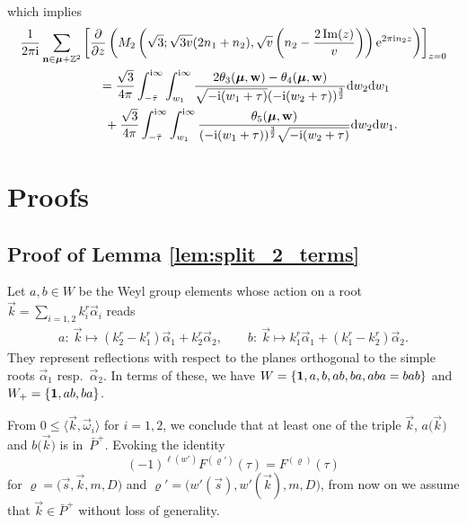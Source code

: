 \documentclass[pdftex]{sigma}
\def\BZ{\mathbb{Z}}
\def\bos{\varrho}
\def\al{\alpha}
\def\bmu{\boldsymbol{\mu}}
\theoremstyle{definition}
\numberwithin{equation}{section}
\begin{document}
which implies
\begin{gather*}%
	\frac{1}{2\pi {\rm i}}
	\sum_{\mathbf{n} \in \boldsymbol{\mu} + \BZ^2}
	\left[\frac{\partial}{\partial z}
	\left(M_2\left(\sqrt 3;\sqrt{3v}(2n_1+n_2),\sqrt{v}
	\left(n_2-\frac{2\operatorname{Im}(z)}{v}\right)\right)
	{\rm e}^{2\pi {\rm i}n_2z}\right)\right]_{z=0}\\
	\qquad=\frac{\sqrt{3}}{4 \pi}
	\int_{-\bar{\tau}}^{{\rm i} \infty}
	\int_{w_1}^{{\rm i} \infty}
	\frac{2\theta_3({\bmu}, {\bf w})-
		\theta_4({\bmu}, {\bf w})}{\sqrt{-{\rm i}(w_1+\tau)}(-{\rm i}(w_2+\tau)
		)^{\frac{3}{2}}}{\rm d}w_2{\rm d}w_1 \\
	\qquad\phantom{=}{}+\frac{\sqrt{3}}{4 \pi}\int_{-\bar{\tau}}^{{\rm i} \infty}\int_{w_1}^{{\rm i} \infty}\frac{\theta_5({\bmu}, {\bf w})}{(-{\rm i}(w_1+\tau))^{\frac{3}{2}}\sqrt{-{\rm i}(w_2+\tau)}}{\rm d}w_2{\rm d}w_1 .
\end{gather*}

\section{Proofs}
\subsection{Proof of Lemma \ref{lem:split_2_terms}}\label{pf_lem:split_2_terms}

Let $a, b\in W$ be the Weyl group elements whose action on a root $\vec k=\sum_{i=1,2} k_i^r \vec \alpha_i $ reads
\begin{gather}
	a\colon\ \vec{k} \mapsto (k_2^r-k_1^r)\vec{\al}_1 +k_2^r \vec{\al}_2,
	\qquad
	b\colon\ \vec{k} \mapsto k_1^r \vec{\al}_1 + (k_1^r-k_2^r) \vec{\al}_2 .
	\label{eq:abaction}
\end{gather}
They represent reflections with respect to the planes orthogonal to the simple roots $\vec\alpha_1$ resp.\ $\vec\alpha_2$.
In terms of these, we have $W=\{{\bf 1}, a, b, ab, ba, aba=bab\}$ and $W_+=\{{\bf 1}, ab, ba\}$.

From $0\leq \langle \vec k, \vec\omega_i\rangle$ for $i=1,2$, we conclude that at least one of the triple $\vec{k}$, $a\bigl(\vec{k}\bigr)$ and $b\bigl(\vec{k}\bigr)$ is in~$\bar P^+$. Evoking the identity
\begin{equation*}
	(-1)^{\ell(w')} F^{(\bos')} (\tau) = F^{(\bos)} (\tau)
\end{equation*}
for $\bos=\bigl(\vec{s},\vec k,m,D\bigr)$ and $\bos'=\bigl(w'(\vec{s}),w'(\vec k),m,D\bigr)$, from now on we assume that $\vec{k}\in \bar P^+$ without loss of generality.
\end{document}

